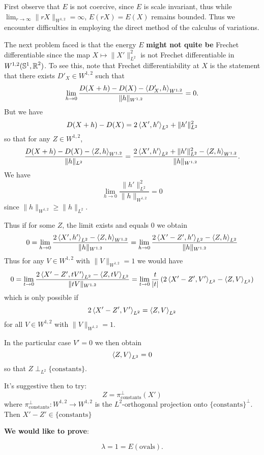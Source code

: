 \documentclass[12pt]{article}
\begin{document}
First observe that \(E\) is not coercive, since \(E\) is scale invariant, thus while \(\lim_{r\to \infty} \|rX\|_{W^{1,2}} = \infty\), \(E(r X) = E(X)\) remains bounded. Thus we encounter difficulties in employing the direct method of the calculus of variations.

The next problem faced is that the energy \(E\) \textbf{might not quite be} Frechet differentiable since the map \(X \mapsto \|X'\|_{L^2}^2\) is not Frechet differentiable in \(W^{1,2} (\operatorname{\mathbb{S}^1}, \operatorname{\mathbb{R}}^2)\). To see this, note that Frechet differentiability at \(X\) is the statement that there exists \(D'_X \in W^{1,2}\) such that
\[
\lim_{h \to 0} \frac{D(X + h) - D(X) - \left\langle{D'_X},{h}\right\rangle_{W^{1,2}}}{\|h\|_{W^{1,2}}} = 0.
\]
But we have
\[
D(X + h) - D(X) = 2 \left\langle{X'},{h'}\right\rangle_{L^2} + \|h'\|^2_{L^2}
\]
so that for any \(Z \in W^{1,2}\),
\[
\frac{D(X + h) - D(X) - \left\langle{Z},{h}\right\rangle_{W^{1,2}}}{\|h\|_{L^2}} = \frac{2 \left\langle{X'},{h'}\right\rangle_{L^2} + \|h'\|^2_{L^2} - \left\langle{Z},{h}\right\rangle_{W^{1,2}}}{\|h\|_{W^{1,2}}}.
\]
We have
\[
\lim_{h\to 0} \frac{\|h'\|^2_{L^2}}{\|h\|_{W^{1,2}}} = 0
\]
since \(\|h\|_{W^{1,2}} \geq \|h\|_{L^2}\).

Thus if for some \(Z\), the limit exists and equals \(0\) we obtain
\[
0 = \lim_{h\to 0} \frac{2 \left\langle{X'},{h'}\right\rangle_{L^2} - \left\langle{Z},{h}\right\rangle_{W^{1,2}}}{\|h\|_{W^{1,2}}} = \lim_{h\to 0} \frac{2 \left\langle{X' - Z'},{h'}\right\rangle_{L^2} - \left\langle{Z},{h}\right\rangle_{L^2}}{\|h\|_{W^{1,2}}}
\]
Thus for any \(V \in W^{1,2}\) with \(\|V\|_{W^{1,2}} = 1\) we would have
\[
0 = \lim_{t\to 0} \frac{2 \left\langle{X' - Z'},{tV'}\right\rangle_{L^2} - \left\langle{Z},{tV}\right\rangle_{L^2}}{\|tV\|_{W^{1,2}}} = \lim_{t\to 0} \frac{t}{|t|} \left(2 \left\langle{X' - Z'},{V'}\right\rangle_{L^2} - \left\langle{Z},{V}\right\rangle_{L^2}\right)
\]
which is only possible if
\[
2 \left\langle{X' - Z'},{V'}\right\rangle_{L^2} = \left\langle{Z},{V}\right\rangle_{L^2}
\]
for all \(V \in W^{1,2}\) with \(\|V\|_{W^{1,2}} = 1\).

In the particular case \(V' = 0\) we then obtain
\[
\left\langle{Z},{V}\right\rangle_{L^2} = 0
\]
so that \(Z \perp_{L^2} \lbrace \text{constants} \rbrace\).

It's suggestive then to try:
\[
Z = \pi^{\perp}_{\text{constants}} (X')
\]
where \(\pi^{\perp}_{\text{constants}} : W^{1,2} \to W^{1,2}\) is the \(L^2\)-orthogonal projection onto \(\lbrace \text{constants}\rbrace^{\perp}\). Then \(X' - Z' \in \lbrace \text{constants}\rbrace\)

\textbf{We would like to prove}:

\begin{theorem}
\[
\lambda = 1 = E(\text{ovals}).
\]
\end{theorem}
\end{document}
